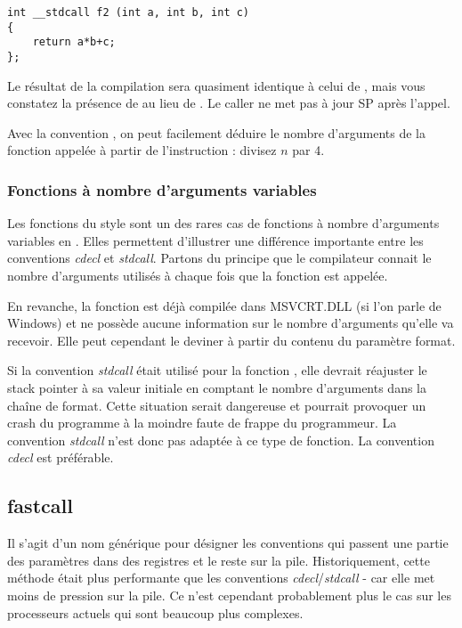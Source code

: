 \begin{lstlisting}[style=customc]
int __stdcall f2 (int a, int b, int c)
{
	return a*b+c;
};
\end{lstlisting}

Le résultat de la compilation sera quasiment identique à celui de , 
mais vous constatez la présence de  au lieu de .
Le \gls{caller} ne met pas à jour {SP} après l'appel.

Avec la convention , on peut facilement déduire le nombre d'arguments de la fonction 
appelée à partir de l'instruction : divisez $n$ par 4.



\subsubsection{Fonctions à nombre d'arguments variables}

Les fonctions du style \printf sont un des rares cas de fonctions à nombre d'arguments variables 
en \CCpp. Elles permettent d'illustrer une différence importante entre les conventions \emph{cdecl} et \emph{stdcall}. 
Partons du principe que le compilateur connait le nombre d'arguments utilisés à chaque fois que la 
fonction \printf est appelée.

En revanche, la fonction \printf est déjà compilée dans MSVCRT.DLL (si l'on parle de Windows) et ne
possède aucune information sur le nombre d'arguments qu'elle va recevoir. Elle peut cependant le
deviner à partir du contenu du paramètre format.

Si la convention \emph{stdcall} était utilisé pour la fonction \printf, elle devrait réajuster le 
\gls{stack pointer} à sa valeur initiale en comptant le nombre d'arguments dans la chaîne de format.
Cette situation serait dangereuse et pourrait provoquer un crash du programme à la moindre faute de
frappe du programmeur.
La convention \emph{stdcall} n'est donc pas adaptée à ce type de fonction. La convention \emph{cdecl} est préférable.

\subsection{fastcall}
\label{fastcall}

Il s'agit d'un nom générique pour désigner les conventions qui passent une partie des paramètres dans
des registres et le reste sur la pile.
Historiquement, cette méthode était plus performante que les conventions \emph{cdecl}/\emph{stdcall} - 
car elle met moins de pression sur la pile. Ce n'est cependant probablement plus le cas sur les
processeurs actuels qui sont beaucoup plus complexes.

